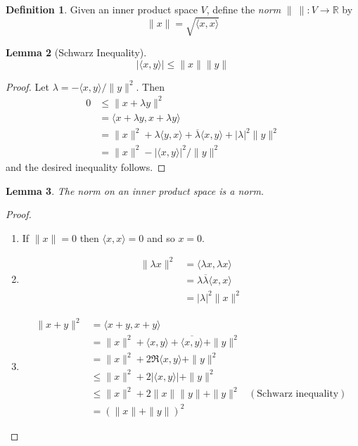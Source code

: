 \documentclass{book}
\newtheorem{lm}{Lemma}[chapter]
\theoremstyle{definition}
\newtheorem{df}[lm]{Definition}
\begin{document}
\begin{df}
  Given an inner product space $V$, define the \emph{norm} $\| \ \| : V
\rightarrow \mathbb{R}$ by
\[ \| x \| = \sqrt{\langle x,x \rangle} \]
\end{df}

\begin{lm}[Schwarz Inequality]
  \[ |\langle x,y \rangle| \leq \| x \| \| y \| \]
\end{lm}

\begin{proof}
Let $\lambda = - \langle x,y \rangle / \| y \|^2$. Then
  \begin{align*}
  0 & \leq \| x + \lambda y \|^2 \\
  & = \langle x + \lambda y, x + \lambda y \rangle \\
  & = \| x \|^2 + \lambda \langle y,x \rangle + \overline{\lambda} \langle x,y
\rangle + |\lambda|^2 \| y \|^2 \\
& =\| x \|^2 - |\langle x,y \rangle|^2/\|y\|^2
  \end{align*}
and the desired inequality follows.
\end{proof}

\begin{lm}
  The norm on an inner product space is a norm.
\end{lm}

\begin{proof}
  \begin{enumerate}
  \item If $\| x \| = 0$ then $\langle x,x \rangle = 0$ and so $x = 0$.
  \item \begin{align*}
          \| \lambda x \|^2 & = \langle \lambda x, \lambda x \rangle \\
          & = \lambda \overline{\lambda} \langle x,x \rangle \\
          & = | \lambda |^2 \| x \|^2
        \end{align*}
  \item \begin{align*}
          \| x + y \|^2 & = \langle x + y, x + y \rangle \\
          & = \| x \|^2 + \langle x,y \rangle + \overline{\langle x,y \rangle}
+ \| y \|^2 \\
& = \| x \|^2 + 2 \Re \langle x,y \rangle + \| y \|^2 \\
& \leq \| x \|^2 + 2 |\langle x,y \rangle| + \| y \|^2 \\
& \leq \| x \|^2 + 2 \| x \| \| y \| + \| y \|^2 & (\text{Schwarz inequality})
\\
& = (\| x \| + \| y \|)^2
        \end{align*}
  \end{enumerate}
\end{proof}
\end{document}
